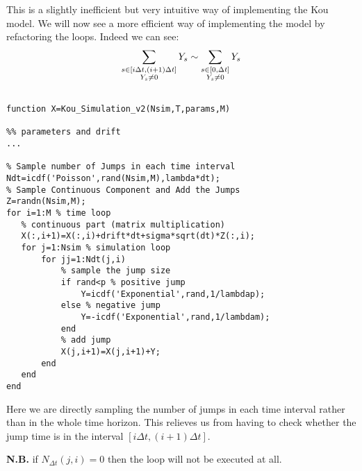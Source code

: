 This is a slightly inefficient but very intuitive way of implementing the Kou
model. We will now see a more efficient way of implementing the model by 
refactoring the loops.
Indeed we can see:
\[ \sum_{\begin{subarray}{c} s\in[i\Delta t, (i+1)\Delta t] \\ Y_s \neq 0
\end{subarray}} Y_s \sim \sum_{\begin{subarray}{c} s\in[0, \Delta t] \\ Y_s \neq
0 \end{subarray}} Y_s \]

\begin{verbatim}

function X=Kou_Simulation_v2(Nsim,T,params,M)

%% parameters and drift
...

% Sample number of Jumps in each time interval
Ndt=icdf('Poisson',rand(Nsim,M),lambda*dt);
% Sample Continuous Component and Add the Jumps
Z=randn(Nsim,M);
for i=1:M % time loop
   % continuous part (matrix multiplication)
   X(:,i+1)=X(:,i)+drift*dt+sigma*sqrt(dt)*Z(:,i);
   for j=1:Nsim % simulation loop
       for jj=1:Ndt(j,i)
           % sample the jump size
           if rand<p % positive jump
               Y=icdf('Exponential',rand,1/lambdap);
           else % negative jump
               Y=-icdf('Exponential',rand,1/lambdam);
           end
           % add jump
           X(j,i+1)=X(j,i+1)+Y;
       end
   end
end
\end{verbatim}

Here we are directly sampling the number of jumps in each time interval rather
than in the whole time horizon. This relieves us from having to check whether
the jump time is in the interval $[i\Delta t, (i+1)\Delta t]$.

\textbf{N.B.} if $N_{\Delta t}(j,i) = 0$ then the loop will not be executed at
all.

